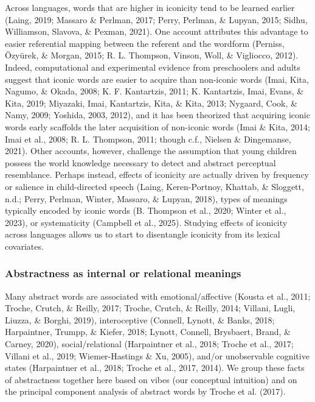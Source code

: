 \documentclass[
  man,floatsintext]{apa6}
\begin{document}
Across languages, words that are higher in iconicity tend to be learned earlier (Laing, 2019; Massaro \& Perlman, 2017; Perry, Perlman, \& Lupyan, 2015; Sidhu, Williamson, Slavova, \& Pexman, 2021). One account attributes this advantage to easier referential mapping between the referent and the wordform (Perniss, Özyürek, \& Morgan, 2015; R. L. Thompson, Vinson, Woll, \& Vigliocco, 2012). Indeed, computational and experimental evidence from preschoolers and adults suggest that iconic words are easier to acquire than non-iconic words (Imai, Kita, Nagumo, \& Okada, 2008; K. F. Kantartzis, 2011; K. Kantartzis, Imai, Evans, \& Kita, 2019; Miyazaki, Imai, Kantartzis, Kita, \& Kita, 2013; Nygaard, Cook, \& Namy, 2009; Yoshida, 2003, 2012), and it has been theorized that acquiring iconic words early scaffolds the later acquisition of non-iconic words (Imai \& Kita, 2014; Imai et al., 2008; R. L. Thompson, 2011; though c.f., Nielsen \& Dingemanse, 2021). Other accounts, however, challenge the assumption that young children possess the world knowledge necessary to detect and abstract perceptual resemblance. Perhaps instead, effects of iconicity are actually driven by frequency or salience in child-directed speech (Laing, Keren-Portnoy, Khattab, \& Sloggett, n.d.; Perry, Perlman, Winter, Massaro, \& Lupyan, 2018), types of meanings typically encoded by iconic words (B. Thompson et al., 2020; Winter et al., 2023), or systematicity (Campbell et al., 2025). Studying effects of iconicity across languages allows us to start to disentangle iconicity from its lexical covariates.

\subsubsection{Abstractness as internal or relational meanings}\label{abstractness-as-internal-or-relational-meanings}

Many abstract words are associated with emotional/affective (Kousta et al., 2011; Troche, Crutch, \& Reilly, 2017; Troche, Crutch, \& Reilly, 2014; Villani, Lugli, Liuzza, \& Borghi, 2019), interoceptive (Connell, Lynott, \& Banks, 2018; Harpaintner, Trumpp, \& Kiefer, 2018; Lynott, Connell, Brysbaert, Brand, \& Carney, 2020), social/relational (Harpaintner et al., 2018; Troche et al., 2017; Villani et al., 2019; Wiemer-Hastings \& Xu, 2005), and/or unobservable cognitive states (Harpaintner et al., 2018; Troche et al., 2017, 2014). We group these facts of abstractness together here based on vibes (our conceptual intuition) and on the principal component analysis of abstract words by Troche et al. (2017).
\end{document}
